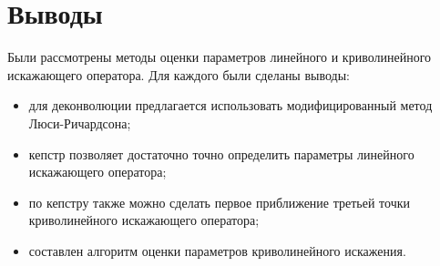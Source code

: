 \section{Выводы}
Были рассмотрены методы оценки параметров линейного и криволинейного искажающего оператора. Для каждого были сделаны выводы:
\begin{itemize}
	\item для деконволюции предлагается использовать модифицированный метод Люси-Ричардсона;
	\item кепстр позволяет достаточно точно определить параметры линейного искажающего оператора;
	\item по кепстру также можно сделать первое приближение третьей точки криволинейного искажающего оператора;
	\item составлен алгоритм оценки параметров криволинейного искажения.
\end{itemize}